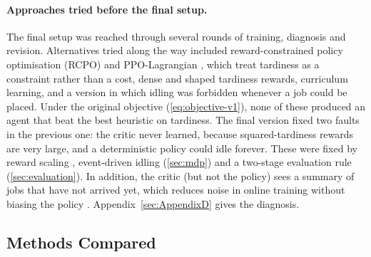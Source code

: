 \documentclass[12pt]{article}
\begin{document}
\paragraph{Approaches tried before the final setup.} The final setup was reached through several rounds of training, diagnosis and revision. Alternatives tried along the way included reward-constrained policy optimisation (RCPO) \cite{tessler2019rcpo} and PPO-Lagrangian \cite{stooke2020pidlagrangian}, which treat tardiness as a constraint rather than a cost, dense and shaped tardiness rewards, curriculum learning, and a version in which idling was forbidden whenever a job could be placed. Under the original objective (\cref{eq:objective-v1}), none of these produced an agent that beat the best heuristic on tardiness. The final version fixed two faults in the previous one: the critic never learned, because squared-tardiness rewards are very large, and a deterministic policy could idle forever. These were fixed by reward scaling \cite{engstrom2020implementation, andrychowicz2021onpolicy}, event-driven idling (\cref{sec:mdp}) and a two-stage evaluation rule (\cref{sec:evaluation}). In addition, the critic (but not the policy) sees a summary of jobs that have not arrived yet, which reduces noise in online training without biasing the policy \cite{mao2019variance, pinto2018asymmetric}. Appendix~\ref{sec:AppendixD} gives the diagnosis.

\subsection{Methods Compared}\label{sec:baselines}
\end{document}

